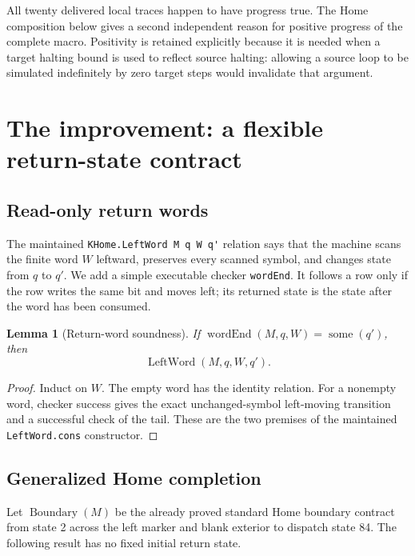 \documentclass[11pt]{article}
\newtheorem{lemma}[theorem]{Lemma}
\theoremstyle{definition}\newtheorem{definition}[theorem]{Definition}
\theoremstyle{remark}\newtheorem{remark}[theorem]{Remark}
\newcommand{\code}[1]{\nolinkurl{#1}}
\begin{document}
All twenty delivered local traces happen to have progress true. The Home composition below gives a second independent reason for positive progress of the complete macro. Positivity is retained explicitly because it is needed when a target halting bound is used to reflect source halting: allowing a source loop to be simulated indefinitely by zero target steps would invalidate that argument.

\section{The improvement: a flexible return-state contract}

\subsection{Read-only return words}

The maintained \code{KHome.LeftWord M q W q'} relation says that the machine scans the finite word $W$ leftward, preserves every scanned symbol, and changes state from $q$ to $q'$. We add a simple executable checker \code{wordEnd}. It follows a row only if the row writes the same bit and moves left; its returned state is the state after the word has been consumed.

\begin{lemma}[Return-word soundness]
If $\operatorname{wordEnd}(M,q,W)=\operatorname{some}(q')$, then
\[
 \operatorname{LeftWord}(M,q,W,q').
\]
\end{lemma}
\begin{proof}
Induct on $W$. The empty word has the identity relation. For a nonempty word, checker success gives the exact unchanged-symbol left-moving transition and a successful check of the tail. These are the two premises of the maintained \code{LeftWord.cons} constructor.
\end{proof}

\subsection{Generalized Home completion}

Let $\operatorname{Boundary}(M)$ be the already proved standard Home boundary contract from state 2 across the left marker and blank exterior to dispatch state 84. The following result has no fixed initial return state.
\end{document}
